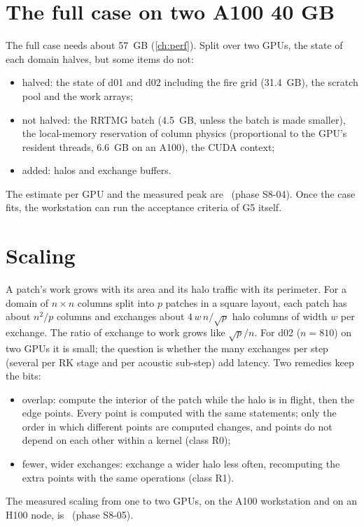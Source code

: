\section{The full case on two A100 40 GB}

The full case needs about 57~GB (\cref{ch:perf}). Split over two GPUs, the state of each domain halves, but some
items do not:
\begin{itemize}
  \item halved: the state of d01 and d02 including the fire grid (31.4~GB), the scratch pool and the work arrays;
  \item not halved: the RRTMG batch (4.5~GB, unless the batch is made smaller), the local-memory reservation of
    column physics (proportional to the GPU's resident threads, 6.6~GB on an A100), the CUDA context;
  \item added: halos and exchange buffers.
\end{itemize}
The estimate per GPU and the measured peak are \tbr\ (phase S8-04). Once the case fits, the workstation can run the
acceptance criteria of G5 itself.

\section{Scaling}

A patch's work grows with its area and its halo traffic with its perimeter. For a domain of $n \times n$ columns split
into $p$ patches in a square layout, each patch has about $n^2/p$ columns and exchanges about $4\,w\,n/\sqrt{p}$ halo
columns of width $w$ per exchange. The ratio of exchange to work grows like $\sqrt{p}/n$. For d02 ($n = 810$) on two
GPUs it is small; the question is whether the many exchanges per step (several per RK stage and per acoustic
sub-step) add latency. Two remedies keep the bits:
\begin{itemize}
  \item overlap: compute the interior of the patch while the halo is in flight, then the edge points. Every point is
    computed with the same statements; only the order in which different points are computed changes, and points do
    not depend on each other within a kernel (class R0);
  \item fewer, wider exchanges: exchange a wider halo less often, recomputing the extra points with the same
    operations (class R1).
\end{itemize}
The measured scaling from one to two GPUs, on the A100 workstation and on an H100 node, is \tbr\ (phase S8-05).
